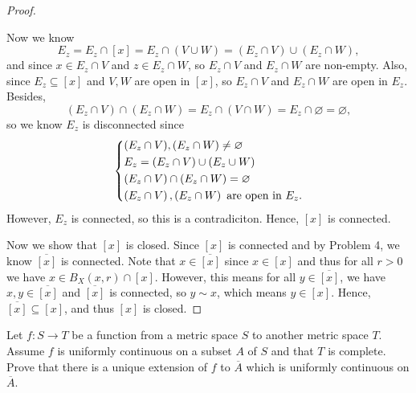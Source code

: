 \begin{proof}
\begin{explanation}
    \end{explanation}    
    Now we know 
    \[
        E_z = E_z \cap [x] = E_z \cap (V \cup W) = (E_z \cap V) \cup (E_z \cap W),
    \] and since \(x \in E_z \cap V\) and \(z \in E_z \cap W\), so \(E_z \cap V\) and \(E_z \cap W\) are non-empty. Also, since \(E_z \subseteq [x]\) and \(V, W\) are open in \([x]\), so \(E_z \cap V\) and \(E_z \cap W\) are open in \(E_z\). Besides, 
    \[
        (E_z \cap V) \cap (E_z \cap W) = E_z \cap (V \cap W) = E_z \cap \varnothing = \varnothing,
    \] so we know \(E_z\) is disconnected since 
    \[
        \begin{dcases}
            (E_z \cap V), (E_z \cap W) \neq \varnothing \\
            E_z = (E_z \cap V ) \cup (E_z \cup W) \\
            (E_z \cap V) \cap (E_z \cap W) = \varnothing \\
            \left( E_z \cap V \right), \left( E_z \cap W \right) \text{ are open in } E_z.  
        \end{dcases}
    \] 
    However, \(E_z\) is connected, so this is a contradiciton. Hence, \([x]\) is connected. 
    
    Now we show that \([x]\) is closed. Since \([x]\) is connected and by Problem 4, we know \(\overline{[x]} \) is connected. Note that \(x \in \overline{[x]} \) since \(x \in [x]\) and thus for all \(r > 0\) we have \(x \in B_X(x, r) \cap [x]\). However, this means for all \(y \in \overline{[x]} \), we have \(x, y \in \overline{[x]} \) and \(\overline{[x]} \) is connected, so \(y \sim x\), which means \(y \in [x]\). Hence, \(\overline{[x]} \subseteq [x]\), and thus \([x]\) is closed.             
\end{proof}
\begin{problem}[15pts]
    Let $f : S \to T$ be a function from a metric space $S$ to another metric space $T$.  
Assume $f$ is uniformly continuous on a subset $A$ of $S$ and that $T$ is complete.  
Prove that there is a unique extension of $f$ to $\overline{A}$ which is uniformly continuous on $\overline{A}$.
\end{problem}


